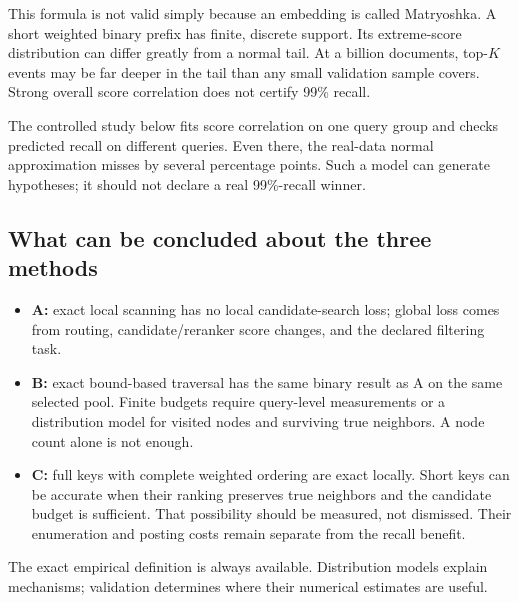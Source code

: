 This formula is not valid simply because an embedding is called Matryoshka. A short weighted
binary prefix has finite, discrete support. Its extreme-score distribution can differ greatly
from a normal tail. At a billion documents, top-$K$ events may be far deeper in the tail than
any small validation sample covers. Strong overall score correlation does not certify 99\% recall.

The controlled study below fits score correlation on one query group and checks predicted
recall on different queries. Even there, the real-data normal approximation misses by several
percentage points. Such a model can generate hypotheses; it should not declare a real
99\%-recall winner.

\subsection{What can be concluded about the three methods}
\begin{itemize}
\item \textbf{A:} exact local scanning has no local candidate-search loss; global loss comes
from routing, candidate/reranker score changes, and the declared filtering task.
\item \textbf{B:} exact bound-based traversal has the same binary result as A on the same
selected pool. Finite budgets require query-level measurements or a distribution model for
visited nodes and surviving true neighbors. A node count alone is not enough.
\item \textbf{C:} full keys with complete weighted ordering are exact locally. Short keys can
be accurate when their ranking preserves true neighbors and the candidate budget is sufficient.
That possibility should be measured, not dismissed. Their enumeration and posting costs remain
separate from the recall benefit.
\end{itemize}
The exact empirical definition is always available. Distribution models explain mechanisms;
validation determines where their numerical estimates are useful.
